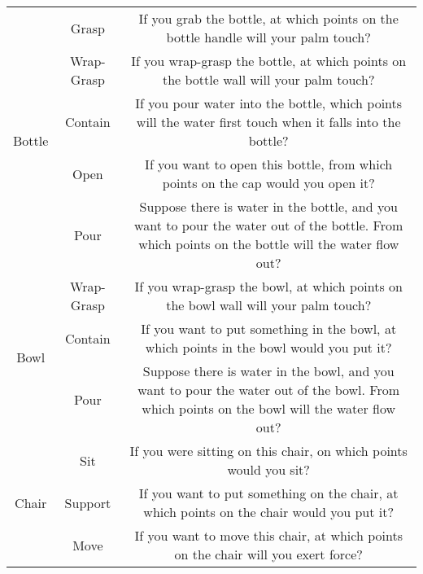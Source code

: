 \documentclass[final]{cvpr}
\begin{document}
\begin{table*}[t]
{\begin{tabular}{c|c|c}
    \multirow{5}{*}{Bottle}           & Grasp               & If you grab the bottle, at which points on the bottle handle will your palm touch?                                                               \\
                                      & Wrap-Grasp          & If you wrap-grasp the bottle, at which points on the bottle wall will your palm touch?                                                           \\
                                      & Contain             & If you pour water into the bottle, which points will the water first touch when it falls into the bottle?                                        \\
                                      & Open                & If you want to open this bottle, from which points on the cap would you open it?                                                                 \\
                                      & Pour                & Suppose there is water in the bottle, and you want to pour the water out of the bottle. From which points on the bottle will the water flow out? \\ \hline
    \multirow{3}{*}{Bowl}             & Wrap-Grasp          & If you wrap-grasp the bowl, at which points on the bowl wall will your palm touch?                                                               \\
                                      & Contain             & If you want to put something in the bowl, at which points in the bowl would you put it?                                                          \\
                                      & Pour                & Suppose there is water in the bowl, and you want to pour the water out of the bowl. From which points on the bowl will the water flow out?       \\ \hline
    \multirow{3}{*}{Chair}            & Sit                 & If you were sitting on this chair, on which points would you sit?                                                                                \\
                                      & Support             & If you want to put something on the chair, at which points on the chair would you put it?                                                        \\
                                      & Move                & If you want to move this chair, at which points on the chair will you exert force?                                                               \\ \hline

\end{tabular}}
\end{table*}
\end{document}
